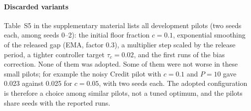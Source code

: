 \paragraph{Discarded variants}
Table~S5 in the supplementary material lists all development pilots (two seeds each, among seeds 0--2): the initial floor fraction $c=0.1$, exponential smoothing of the released gap (EMA, factor 0.3), a multiplier step scaled by the release period, a tighter controller target $\tau_c=0.02$, and the first runs of the bias correction. None of them was adopted. Some of them were not worse in these small pilots; for example the noisy Credit pilot with $c=0.1$ and $P=10$ gave 0.023 against 0.025 for $c=0.05$, with two seeds each. The adopted configuration is therefore a choice among similar pilots, not a tuned optimum, and the pilots share seeds with the reported runs.
